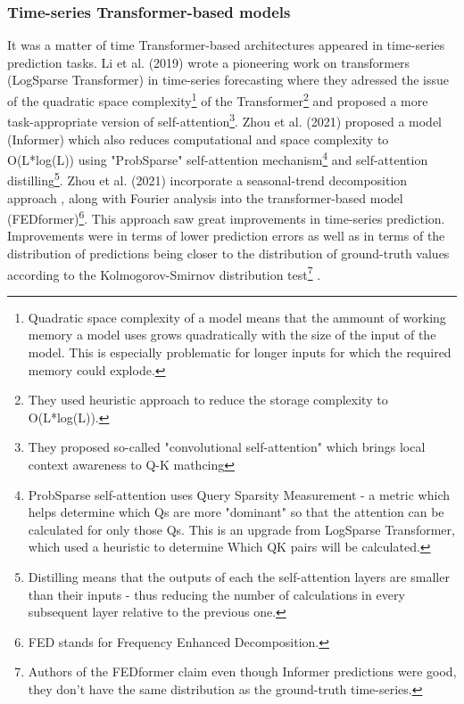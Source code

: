 \subsubsection{Time-series Transformer-based models}

It was a matter of time Transformer-based architectures appeared in time-series prediction tasks. Li et al. (2019) \cite{li2019enhancing} wrote a pioneering work on transformers (LogSparse Transformer) in time-series forecasting where they adressed the issue of the quadratic space complexity\footnote{Quadratic space complexity of a model means that the ammount of working memory a model uses grows quadratically with the size of the input of the model. This is especially problematic for longer inputs for which the required memory could explode.} of the Transformer\footnote{They used heuristic approach to reduce the storage complexity to O(L*log(L)).} and proposed a more task-appropriate version of self-attention\footnote{They proposed so-called "convolutional self-attention" which brings local context awareness to Q-K mathcing}. Zhou et al. (2021) \cite{zhou2021informer} proposed a model (Informer) which also reduces computational and space complexity to O(L*log(L)) using "ProbSparse" self-attention mechanism\footnote{ProbSparse self-attention uses Query Sparsity Measurement - a metric which helps determine which Qs are more "dominant" so that the attention can be calculated for only those Qs. This is an upgrade from LogSparse Transformer, which used a heuristic to determine Which QK pairs will be calculated.} and self-attention distilling\footnote{Distilling means that the outputs of each the self-attention layers are smaller than their inputs - thus reducing the number of calculations in every subsequent layer relative to the previous one.}. Zhou et al. (2021) \cite{zhou2022fedformer} incorporate a seasonal-trend decomposition approach \cite{cleveland1990stl} \cite{wen2019robuststl}, along with Fourier analysis into the transformer-based model (FEDformer)\footnote{FED stands for Frequency Enhanced Decomposition.}. This approach saw great improvements in time-series prediction. Improvements were in terms of lower prediction errors as well as in terms of the distribution of predictions being closer to the distribution of ground-truth values according to the Kolmogorov-Smirnov distribution test\footnote{Authors of the FEDformer claim even though Informer predictions were good, they don't have the same distribution as the ground-truth time-series.} \cite{massey1951kolmogorov}.



